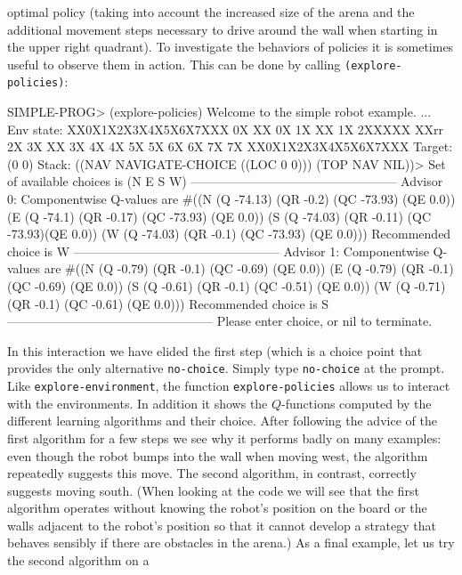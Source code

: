\documentclass[a4paper]{amsart}
\begin{document}
optimal policy (taking into account the increased size of the arena
and the additional movement steps necessary to drive around the wall
when starting in the upper right quadrant).  To investigate the
behaviors of policies it is sometimes useful to observe them in
action.  This can be done by calling \texttt{(explore-policies)}:
\begin{Code}
  SIMPLE-PROG> (explore-policies)
  Welcome to the simple robot example.
  \lsq...\rsq
  Env state: 
  XX0X1X2X3X4X5X6X7XXX
  0X      XX        0X
  1X      XX        1X
  2XXXXX  XXrr      2X
  3X      XX        3X
  4X                4X
  5X                5X
  6X                6X
  7X                7X
  XX0X1X2X3X4X5X6X7XXX
  Target: (0 0)
  Stack: ((NAV NAVIGATE-CHOICE ((LOC 0 0))) (TOP NAV NIL))>
  Set of available choices is (N E S W)
  --------------------------------------------------
  Advisor 0: 
  Componentwise Q-values are
    #((N (Q -74.13) (QR -0.2) (QC -73.93) (QE 0.0))
      (E (Q -74.1) (QR -0.17) (QC -73.93) (QE 0.0))
      (S (Q -74.03) (QR -0.11) (QC -73.93)(QE 0.0))
      (W (Q -74.03) (QR -0.1) (QC -73.93) (QE 0.0)))
  Recommended choice is W
  --------------------------------------------------
  Advisor 1: 
  Componentwise Q-values are
    #((N (Q -0.79) (QR -0.1) (QC -0.69) (QE 0.0))
      (E (Q -0.79) (QR -0.1) (QC -0.69) (QE 0.0))
      (S (Q -0.61) (QR -0.1) (QC -0.51) (QE 0.0))
      (W (Q -0.71) (QR -0.1) (QC -0.61) (QE 0.0)))
  Recommended choice is S
  --------------------------------------------------
  Please enter choice, or nil to terminate. 
\end{Code}
In this interaction we have elided the first step (which is a choice
point that provides the only alternative \texttt{no-choice}.  Simply
type \texttt{no-choice} at the prompt.  Like
\texttt{explore-environment}, the function \texttt{explore-policies}
allows us to interact with the environments.  In addition it shows the
$Q$-functions computed by the different learning algorithms and their
choice.  After following the advice of the first algorithm for a few
steps we see why it performs badly on many examples: even though the
robot bumps into the wall when moving west, the algorithm repeatedly
suggests this move.  The second algorithm, in contrast, correctly
suggests moving south.  (When looking at the code we will see that the
first algorithm operates without knowing the robot's position on the
board or the walls adjacent to the robot's position so that it cannot
develop a strategy that behaves sensibly if there are obstacles in the
arena.)  As a final example, let us try the second algorithm on a
\end{document}
